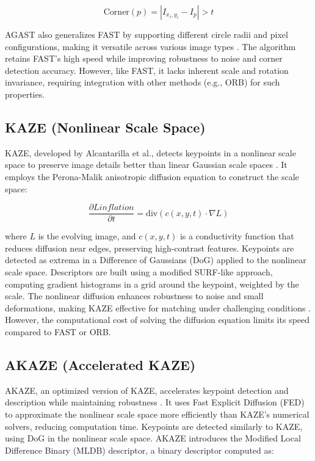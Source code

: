 \documentclass[journal]{IEEEtran}
\begin{document}
\begin{equation}
\text{Corner}(p) = \left| I_{x_i, y_i} - I_p \right| > t
\end{equation}

AGAST also generalizes FAST by supporting different circle radii and pixel configurations, making it versatile across various image types \cite{AGAST}. The algorithm retains FAST’s high speed while improving robustness to noise and corner detection accuracy. However, like FAST, it lacks inherent scale and rotation invariance, requiring integration with other methods (e.g., ORB) for such properties.\\

\subsection{KAZE (Nonlinear Scale Space)}
KAZE, developed by Alcantarilla et al., detects keypoints in a nonlinear scale space to preserve image details better than linear Gaussian scale spaces \cite{KAZE}. It employs the Perona-Malik anisotropic diffusion equation to construct the scale space:

\begin{equation}
\frac{\partial L inflation}{\partial t} = \text{div}(c(x, y, t) \cdot \nabla L)
\end{equation}

where \( L \) is the evolving image, and \( c(x, y, t) \) is a conductivity function that reduces diffusion near edges, preserving high-contrast features. Keypoints are detected as extrema in a Difference of Gaussians (DoG) applied to the nonlinear scale space. Descriptors are built using a modified SURF-like approach, computing gradient histograms in a grid around the keypoint, weighted by the scale. The nonlinear diffusion enhances robustness to noise and small deformations, making KAZE effective for matching under challenging conditions \cite{KAZE}. However, the computational cost of solving the diffusion equation limits its speed compared to FAST or ORB.\\

\subsection{AKAZE (Accelerated KAZE)}
AKAZE, an optimized version of KAZE, accelerates keypoint detection and description while maintaining robustness \cite{KAZE}. It uses Fast Explicit Diffusion (FED) to approximate the nonlinear scale space more efficiently than KAZE’s numerical solvers, reducing computation time. Keypoints are detected similarly to KAZE, using DoG in the nonlinear scale space. AKAZE introduces the Modified Local Difference Binary (MLDB) descriptor, a binary descriptor computed as:
\end{document}
